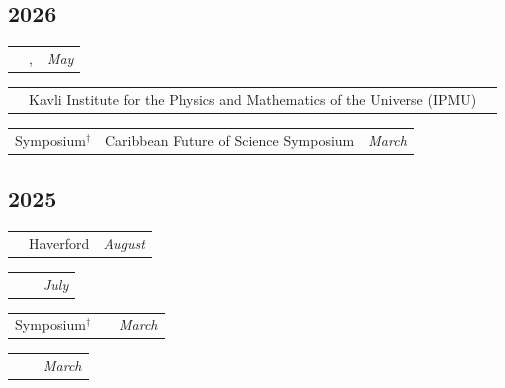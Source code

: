 \documentclass[10pt,a4paper, roman]{moderncv}
\makeatletter
\renewcommand*{\cvitemwithcomment}[3]{%
\parbox{\textwidth}{%
\begin{tabularx}{\textwidth}{@{} p{1.0in} X r @{}} #1 & #2 & \textit{#3} \end{tabularx}%
}%
}
\newcommand{\chref}[3][mutedblue]{\href{#2}{\color{#1}{#3}}}
\newcommand{\chrefccs}[2]{\chref[mutedred]{https://cyril-creque.github.io/files/#1}{#2}}
\makeatother
\begin{document}
\subsection{2026}
\cvitemwithcomment{\chrefccs{talks/Spurions_IPMU_2026.pdf}{Workshop*}}{\chref[mutedblue]{https://indico.ipmu.jp/event/492/}{JHU/IPMU: Quantum Field Theory, Particle Physics and Cosmology},}{May}
\cvitemwithcomment{}{Kavli Institute for the Physics and Mathematics of the Universe (IPMU)}{}
\cvitemwithcomment{Symposium$^\dagger$}{Caribbean Future of Science Symposium}{March}
\subsection{2025}
\cvitemwithcomment{\chrefccs{talks/Haverford_Colloquium.pdf}{Colloquium*}}{Haverford}{August}
\cvitemwithcomment{\chrefccs{talks/KCFest_2025.pdf}{Workshop*}}{\chref[mutedblue]{https://indico.global/event/14235/overview}{Cosmology Summer Fest}}{July}
\cvitemwithcomment{Symposium$^\dagger$}{\chref[mutedblue]{https://sta.uwi.edu/principal/second-caribbean-future-of-science-symposium/}{Caribbean Future of Science Symposium}}{March}
\cvitemwithcomment{\chrefccs{talks/Cosmic_Magnetic_Shear_of_Blazars-Princeton.pdf}{Seminar*}}{\chref[mutedblue]{https://phy.princeton.edu/events/dark-cosmos-seminar-318-4-pm-cyril-creque-sarbinowski-center-computational-astrophysics}{Dark Cosmos Seminar}}{March}
\end{document}
